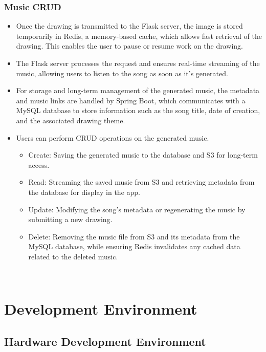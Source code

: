 \documentclass[conference]{IEEEtran}
\begin{document}
\subsubsection{Music CRUD}
\begin{itemize}
    \item Once the drawing is transmitted to the Flask server, the image is stored temporarily in Redis, a memory-based cache, which allows fast retrieval of the drawing. This enables the user to pause or resume work on the drawing.\\
    \item The Flask server processes the request and ensures real-time streaming of the music, allowing users to listen to the song as soon as it's generated.\\
    \item For storage and long-term management of the generated music, the metadata and music links are handled by Spring Boot, which communicates with a MySQL database to store information such as the song title, date of creation, and the associated drawing theme.\\
    \item Users can perform CRUD operations on the generated music.
\begin{itemize}
    \item Create: Saving the generated music to the database and S3 for long-term access.\\
    \item Read: Streaming the saved music from S3 and retrieving metadata from the database for display in the app.\\
    \item Update: Modifying the song’s metadata or regenerating the music by submitting a new drawing.\\
    \item Delete: Removing the music file from S3 and its metadata from the MySQL database, while ensuring Redis invalidates any cached data related to the deleted music.\\
\end{itemize}
\end{itemize}

\

\section{Development Environment}

\subsection{Hardware Development Environment}
\end{document}
